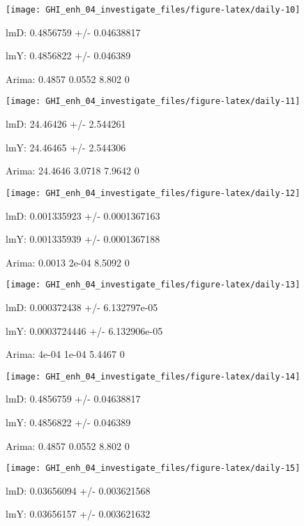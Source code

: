 \documentclass[
  10pt,
  a4paper,oneside]{article}
\begin{document}
\begin{center}\texttt{[image: GHI\_enh\_04\_investigate\_files/figure-latex/daily-10]} \end{center}

lmD: 0.4856759 +/- 0.04638817

lmY: 0.4856822 +/- 0.046389

Arima: 0.4857 0.0552 8.802 0

\begin{center}\texttt{[image: GHI\_enh\_04\_investigate\_files/figure-latex/daily-11]} \end{center}

lmD: 24.46426 +/- 2.544261

lmY: 24.46465 +/- 2.544306

Arima: 24.4646 3.0718 7.9642 0

\begin{center}\texttt{[image: GHI\_enh\_04\_investigate\_files/figure-latex/daily-12]} \end{center}

lmD: 0.001335923 +/- 0.0001367163

lmY: 0.001335939 +/- 0.0001367188

Arima: 0.0013 2e-04 8.5092 0

\begin{center}\texttt{[image: GHI\_enh\_04\_investigate\_files/figure-latex/daily-13]} \end{center}

lmD: 0.000372438 +/- 6.132797e-05

lmY: 0.0003724446 +/- 6.132906e-05

Arima: 4e-04 1e-04 5.4467 0

\begin{center}\texttt{[image: GHI\_enh\_04\_investigate\_files/figure-latex/daily-14]} \end{center}

lmD: 0.4856759 +/- 0.04638817

lmY: 0.4856822 +/- 0.046389

Arima: 0.4857 0.0552 8.802 0

\begin{center}\texttt{[image: GHI\_enh\_04\_investigate\_files/figure-latex/daily-15]} \end{center}

lmD: 0.03656094 +/- 0.003621568

lmY: 0.03656157 +/- 0.003621632
\end{document}
